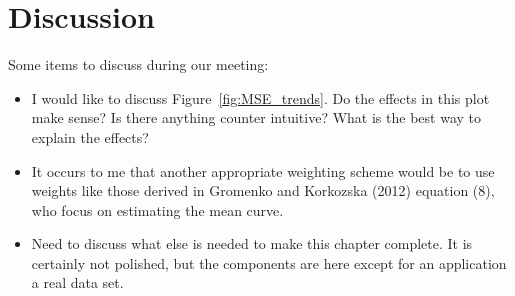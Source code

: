\newpage
\section{Discussion} %
\label{sec:discussion}

Some items to discuss during our meeting:
\begin{itemize}
	\item I would like to discuss Figure~\ref{fig:MSE_trends}. Do the effects in this plot make sense? Is there anything counter intuitive? What is the best way to explain the effects? 
	\item It occurs to me that another appropriate weighting scheme would be to use weights like those derived in Gromenko and Korkozska (2012) equation (8), who focus on estimating the mean curve.
	\item Need to discuss what else is needed to make this chapter complete. It is certainly not polished, but the components are here except for an application a real data set. 
\end{itemize}



